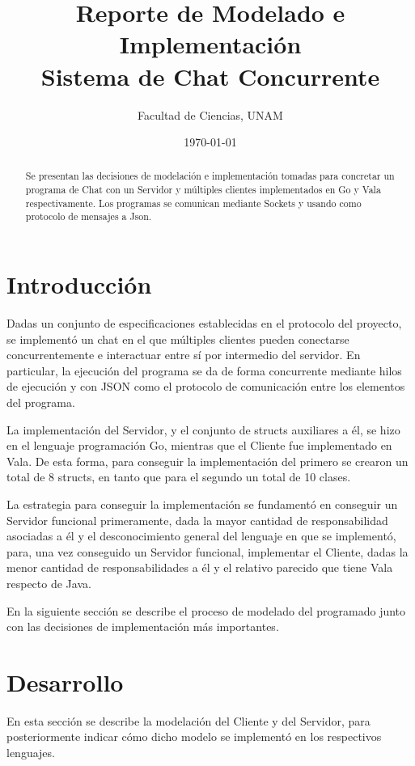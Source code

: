 \documentclass[11pt, a4paper]{article}
\title{\textbf{Reporte de Modelado e Implementación\\Sistema de Chat Concurrente}}
\author{Facultad de Ciencias, UNAM}
\date{\today}
\begin{document}
\maketitle

\begin{abstract}
Se presentan las decisiones de modelación e implementación tomadas para concretar un programa de Chat con un Servidor y múltiples clientes implementados en Go y Vala respectivamente. Los programas se comunican mediante Sockets y usando como protocolo de mensajes a Json.
\end{abstract}

\section*{Introducción}

Dadas un conjunto de especificaciones establecidas en el protocolo del proyecto, se implementó un chat en el que múltiples clientes pueden conectarse concurrentemente e interactuar entre sí por intermedio del servidor. En particular, la ejecución del programa se da de forma concurrente mediante hilos de ejecución y con JSON como el protocolo de comunicación entre los elementos del programa.

La implementación del Servidor, y el conjunto de structs auxiliares a él, se hizo en el lenguaje programación Go, mientras que el Cliente fue implementado en Vala. De esta forma, para conseguir la implementación del primero se crearon un total de 8 structs, en tanto que para el segundo un total de 10 clases.

La estrategia para conseguir la implementación se fundamentó en conseguir un Servidor funcional primeramente, dada la mayor cantidad de responsabilidad asociadas a él y el desconocimiento general del lenguaje en que se implementó, para, una vez conseguido un Servidor funcional, implementar el Cliente, dadas la menor cantidad de responsabilidades a él y el relativo parecido que tiene Vala respecto de Java.

En la siguiente sección se describe el proceso de modelado del programado junto con las decisiones de implementación más importantes.

\section*{Desarrollo}

En esta sección se describe la modelación del Cliente y del Servidor, para posteriormente indicar cómo dicho modelo se implementó en los respectivos lenguajes.
\end{document}
